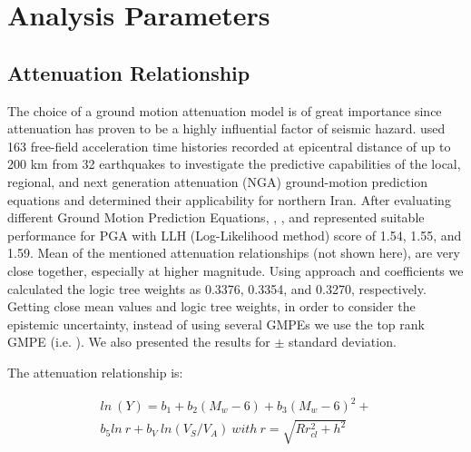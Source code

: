
\section{Analysis Parameters}
\subsection{Attenuation Relationship}
The choice of a ground motion attenuation model is of great importance since attenuation has proven to be a highly influential factor of seismic hazard. \citet{Zafarani2014} used 163 free-field acceleration time histories recorded at epicentral distance of up to 200 km from 32 earthquakes to investigate the predictive capabilities of the local, regional, and next generation attenuation (NGA) ground-motion prediction equations and determined their applicability for northern Iran. After evaluating different Ground Motion Prediction Equations, \citet{Kalkan2004}, \citet{Chiou2008}, and \citet{Boore2008} represented suitable performance for  PGA  with LLH (Log-Likelihood method) score of 1.54, 1.55, and 1.59. Mean of the mentioned attenuation relationships (not shown here), are very close together, especially at higher magnitude. Using \citet{Scherbaum2009} approach and \citet{Zafarani2014} coefficients we calculated the logic tree weights as 0.3376, 0.3354, and 0.3270, respectively. Getting close mean values and logic tree weights, in order to consider the epistemic uncertainty, instead of using several GMPEs we use the top rank GMPE (i.e.  \citet{Kalkan2004} ). We also presented the results for  $\pm$ standard deviation. \\

\noindent

The attenuation relationship is:

\begin{equation}
\begin{split}
ln\ (Y) = b_1 + b_2(M_w-6) + b_3( M_w-6)^{2}+  \\ 
b_5ln\ r + b_V \ ln(V_S/V_A) \  with \  r= \sqrt{R{r^2_{cl} + h^2}}  
\end{split}
\end{equation}

